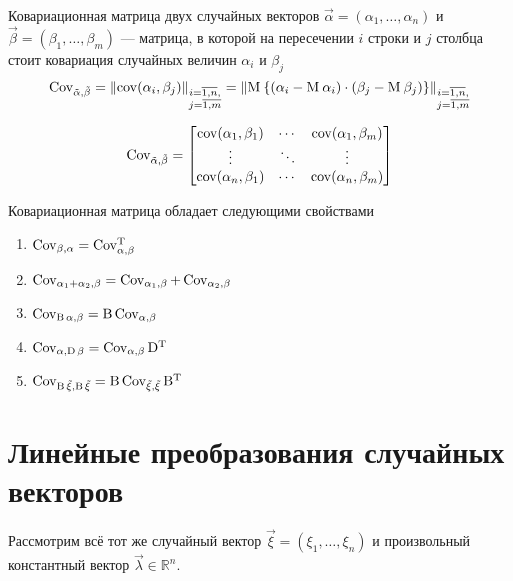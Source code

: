 \begin{definition}
    Ковариационная матрица двух случайных векторов
    $\vec{\alpha} = \left( \alpha_1, \dots, \alpha_n \right)$ и
    $\vec{\beta} = \left( \beta_1, \dots, \beta_m \right)$ --- матрица,
    в которой на пересечении $i$ строки и $j$ столбца стоит ковариация случайных
    величин $\alpha_i$ и $\beta_j$
    $$\operatorname{Cov_{\vec{\alpha}, \vec{\beta}}}
        = \left\| \operatorname{cov}\!\left( \alpha_i, \beta_j \right) \right\|_{
            \substack{i=\overline{1,n},\\j=\overline{1,m}}}
        = \left\| \operatorname{M}_{} 
            \left\{ \left( \alpha_i - \operatorname{M}_{} \alpha_i \right)
                \cdot \left( \beta_j - \operatorname{M}_{} \beta_j \right)
            \right\} \right\|_{
                \substack{i=\overline{1,n},\\j=\overline{1,m}}}$$

    $$\operatorname{Cov_{\vec{\alpha}, \vec{\beta}}} =
    \begin{bmatrix}
        \operatorname{cov}\!\left( \alpha_1, \beta_1 \right) & \cdots & \operatorname{cov}\!\left( \alpha_1, \beta_m \right) \\
        \vdots & \ddots & \vdots \\
        \operatorname{cov}\!\left( \alpha_n, \beta_1 \right) & \cdots & \operatorname{cov}\!\left( \alpha_n, \beta_m \right)
    \end{bmatrix}$$
\end{definition}

Ковариационная матрица обладает следующими свойствами
\begin{enumerate}
    \item $\operatorname{Cov_{\beta, \alpha}} = \operatorname{Cov^T_{\alpha, \beta}}$
    \item $\operatorname{Cov_{\alpha_1 + \alpha_2, \beta}}
        = \operatorname{Cov_{\alpha_1, \beta}} + \operatorname{Cov_{\alpha_2, \beta}}$
    \item $\operatorname{Cov_{\operatorname{B} \alpha, \beta}}
        = \operatorname{B} \operatorname{Cov_{\alpha, \beta}}$
    \item $\operatorname{Cov_{\alpha, \operatorname{D} \beta}}
        = \operatorname{Cov_{\alpha, \beta}} \operatorname{D^T}$
    \item $\operatorname{Cov_{\operatorname{B} \vec{\xi}, \operatorname{B} \vec{\xi}}}
        = \operatorname{B} \operatorname{Cov_{\vec{\xi}, \vec{\xi}}} \operatorname{B^T}$
\end{enumerate}



\section{Линейные преобразования случайных векторов}
\label{section:linearTransformations}
Рассмотрим всё тот же случайный вектор $\vec{\xi} = \left( \xi_1, \dots, \xi_n
\right)$ и произвольный константный вектор $\vec{\lambda} \in \mathbb{R}^n$.

